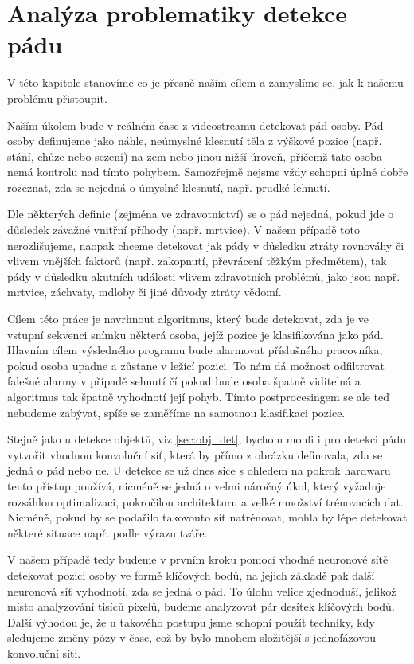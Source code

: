 \chapter{Analýza problematiky detekce pádu}
\label{sec:Goal}

V této kapitole stanovíme co je přesně naším cílem a zamyslíme se, jak k našemu
problému přistoupit.

Naším úkolem bude v reálném čase z videostreamu detekovat pád osoby. Pád osoby
definujeme jako náhle, neúmyslné klesnutí těla z výškové pozice (např. stání,
chůze nebo sezení) na zem nebo jinou nižší úroveň, přičemž tato osoba nemá
kontrolu nad tímto pohybem. Samozřejmě nejsme vždy schopni úplně dobře
rozeznat, zda se nejedná o úmyslné klesnutí, např. prudké lehnutí.

Dle některých definic (zejména ve zdravotnictví) se o pád nejedná, pokud jde o
důsledek závažné vnitřní příhody (např. mrtvice). V našem případě toto
nerozlišujeme, naopak chceme detekovat jak pády v důsledku ztráty rovnováhy či
vlivem vnějších faktorů (např. zakopnutí, převrácení těžkým předmětem), tak
pády v důsledku akutních události vlivem zdravotních problémů, jako jsou např.
mrtvice, záchvaty, mdloby či jiné důvody ztráty vědomí.

Cílem této práce je navrhnout algoritmus, který bude detekovat, zda je ve
vstupní sekvenci snímku některá osoba, jejíž pozice je klasifikována jako pád.
Hlavním cílem výsledného programu bude alarmovat příslušného pracovníka, pokud
osoba upadne a zůstane v ležící pozici. To nám dá možnost odfiltrovat falešné
alarmy v případě sehnutí čí pokud bude osoba špatně viditelná a algoritmus tak
špatně vyhodnotí její pohyb. Tímto postprocesingem se ale teď nebudeme zabývat,
spíše se zaměříme na samotnou klasifikaci pozice.

Stejně jako u detekce objektů, viz \ref{sec:obj_det}, bychom mohli i pro
detekci pádu vytvořit vhodnou konvoluční síť, která by přímo z obrázku
definovala, zda se jedná o pád nebo ne. U detekce se už dnes sice s ohledem na
pokrok hardwaru tento přístup používá, nicméně se jedná o velmi náročný úkol,
který vyžaduje rozsáhlou optimalizaci, pokročilou architekturu a velké množství
trénovacích dat. Nicméně, pokud by se podařilo takovouto síť natrénovat, mohla
by lépe detekovat některé situace např. podle výrazu tváře.

V našem případě tedy budeme v prvním kroku pomocí vhodné neuronové sítě
detekovat pozici osoby ve formě klíčových bodů, na jejich základě pak další
neuronová síť vyhodnotí, zda se jedná o pád. To úlohu velice zjednoduší,
jelikož místo analyzování tisíců pixelů, budeme analyzovat pár desítek
klíčových bodů. Další výhodou je, že u takového postupu jsme schopní použít
techniky, kdy sledujeme změny pózy v čase, což by bylo mnohem složitější s
jednofázovou konvoluční síti.


